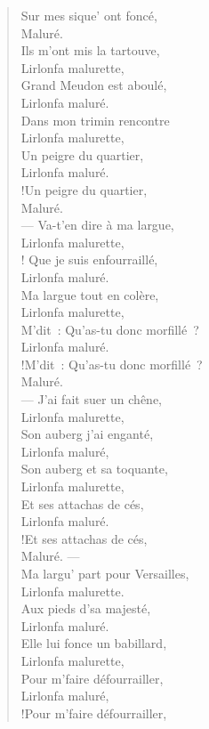 \documentclass[french,twoside]{book} %
\begin{document}
\begin{verse}
Sur mes sique’ ont foncé,\\
Maluré.\\
Ils m’ont mis la tartouve,\\
Lirlonfa malurette,\\
Grand Meudon est aboulé,\\
Lirlonfa maluré.\\
Dans mon trimin rencontre\\
Lirlonfa malurette,\\
Un peigre du quartier,\\
Lirlonfa maluré.\\!Un peigre du quartier,\\
Maluré.\\
— Va-t’en dire à ma largue,\\
Lirlonfa malurette,\\! Que je suis enfourraillé,\\
Lirlonfa maluré.\\
Ma largue tout en colère,\\
Lirlonfa malurette,\\
M’dit : Qu’as-tu donc morfillé ?\\
Lirlonfa maluré.\\!M’dit : Qu’as-tu donc morfillé ?\\
Maluré.\\
 — J’ai fait suer un chêne,\\
Lirlonfa malurette,\\
Son auberg j’ai enganté,\\
Lirlonfa maluré,\\
Son auberg et sa toquante,\\
Lirlonfa malurette,\\
Et ses attachas de cés,\\
Lirlonfa maluré.\\!Et ses attachas de cés,\\
Maluré. — \\
Ma largu’ part pour Versailles,\\
Lirlonfa malurette.\\
Aux pieds d’sa majesté,\\
Lirlonfa maluré.\\
Elle lui fonce un babillard,\\
Lirlonfa malurette,\\
Pour m’faire défourrailler,\\
Lirlonfa maluré,\\!Pour m’faire défourrailler,\\

\end{verse}
\end{document}
